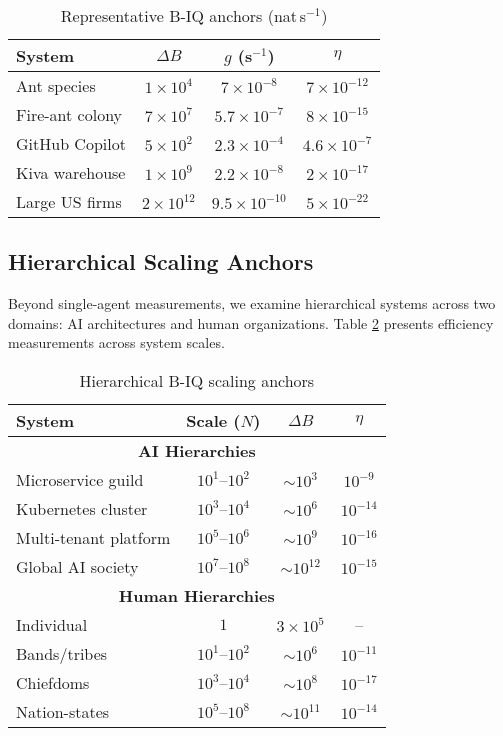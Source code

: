 \documentclass[10pt,conference]{IEEEtran}
\begin{document}
\begin{table}[!ht]
\centering\footnotesize
\caption{Representative B-IQ anchors (nat\,s\(^{-1}\))}
\label{tab:anchors}
\begin{tabular}{lccc}
\hline
System & $\Delta B$ & $g$ (s$^{-1}$) & $\eta$ \\
\hline
Ant species & $1\times10^{4}$ & $7\!\times\!10^{-8}$ & $7\!\times\!10^{-12}$\\
Fire-ant colony & $7\!\times\!10^{7}$ & $5.7\!\times\!10^{-7}$ & $8\!\times\!10^{-15}$\\
GitHub Copilot & $5\!\times\!10^{2}$ & $2.3\!\times\!10^{-4}$ & $4.6\!\times\!10^{-7}$\\
Kiva warehouse & $1\!\times\!10^{9}$ & $2.2\!\times\!10^{-8}$ & $2\!\times\!10^{-17}$\\
Large US firms & $2\!\times\!10^{12}$ & $9.5\!\times\!10^{-10}$ & $5\!\times\!10^{-22}$\\
\hline
\end{tabular}
\end{table}

\subsection{Hierarchical Scaling Anchors}
\label{sec:hier_anchors}

Beyond single-agent measurements, we examine hierarchical systems across two domains: AI architectures and human organizations. Table \ref{tab:hierarchical} presents efficiency measurements across system scales.

\begin{table}[!ht]
\centering\footnotesize
\caption{Hierarchical B-IQ scaling anchors}
\label{tab:hierarchical}
\begin{tabular}{lccc}
\hline
System & Scale ($N$) & $\Delta B$ & $\eta$ \\
\hline
\multicolumn{4}{c}{\textbf{AI Hierarchies}} \\
\hline
Microservice guild & $10^1$--$10^2$ & $\sim10^3$ & $10^{-9}$ \\
Kubernetes cluster & $10^3$--$10^4$ & $\sim10^6$ & $10^{-14}$ \\
Multi-tenant platform & $10^5$--$10^6$ & $\sim10^9$ & $10^{-16}$ \\
Global AI society & $10^7$--$10^8$ & $\sim10^{12}$ & $10^{-15}$ \\
\hline
\multicolumn{4}{c}{\textbf{Human Hierarchies}} \\
\hline
Individual & $1$ & $3\times10^5$ & -- \\
Bands/tribes & $10^1$--$10^2$ & $\sim10^6$ & $10^{-11}$ \\
Chiefdoms & $10^3$--$10^4$ & $\sim10^8$ & $10^{-17}$ \\
Nation-states & $10^5$--$10^8$ & $\sim10^{11}$ & $10^{-14}$ \\
\hline
\end{tabular}
\end{table}
\end{document}
